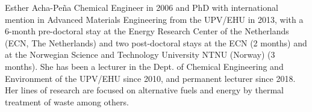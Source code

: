 \documentclass[journal,twoside,web]{ieeecolor}
\begin{document}
\begin{IEEEbiography}{Esther Acha-Peña}
Chemical Engineer in 2006 and PhD with international mention in Advanced Materials Engineering from the UPV/EHU in 2013, with a 6-month pre-doctoral stay at the Energy Research Center of the Netherlands (ECN, The Netherlands) and two post-doctoral stays at the ECN (2 months) and at the Norwegian Science and Technology University NTNU (Norway) (3 months). She has been a lecturer in the Dept. of Chemical Engineering and Environment of the UPV/EHU since 2010, and permanent lecturer since 2018. Her lines of research are focused on alternative fuels and energy by thermal treatment of waste among others.
\end{IEEEbiography}
\end{document}

